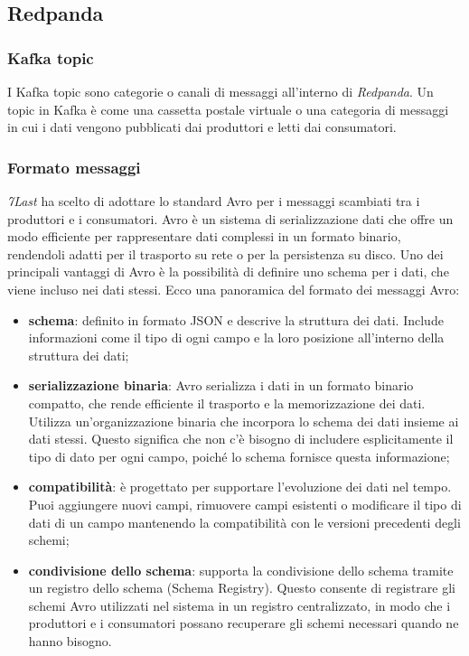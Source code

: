 \subsection{Redpanda}
\subsubsection{Kafka topic}
I Kafka topic sono categorie o canali di messaggi all'interno di \textit{Redpanda}. Un topic in Kafka è come una cassetta postale virtuale o una categoria di messaggi in cui i dati vengono pubblicati dai produttori e letti dai consumatori.
\subsubsection{Formato messaggi}
\textit{7Last} ha scelto di adottare lo standard Avro per i messaggi scambiati tra i produttori e i consumatori. Avro è un sistema di serializzazione dati che offre un modo efficiente per rappresentare dati complessi in un formato binario, rendendoli adatti per il trasporto su rete o per la persistenza su disco. Uno dei principali vantaggi di Avro è la possibilità di definire uno schema per i dati, che viene incluso nei dati stessi. Ecco una panoramica del formato dei messaggi Avro:
\begin{itemize}
    \item \textbf{schema}: definito in formato JSON e descrive la struttura dei dati. Include informazioni come il tipo di ogni campo e la loro posizione all'interno della struttura dei dati;
    \item \textbf{serializzazione binaria}: Avro serializza i dati in un formato binario compatto, che rende efficiente il trasporto e la memorizzazione dei dati. Utilizza un'organizzazione binaria che incorpora lo schema dei dati insieme ai dati stessi. Questo significa che non c'è bisogno di includere esplicitamente il tipo di dato per ogni campo, poiché lo schema fornisce questa informazione;
    \item \textbf{compatibilità}: è progettato per supportare l'evoluzione dei dati nel tempo. Puoi aggiungere nuovi campi, rimuovere campi esistenti o modificare il tipo di dati di un campo mantenendo la compatibilità con le versioni precedenti degli schemi;
    \item \textbf{condivisione dello schema}: supporta la condivisione dello schema tramite un registro dello schema (Schema Registry). Questo consente di registrare gli schemi Avro utilizzati nel sistema in un registro centralizzato, in modo che i produttori e i consumatori possano recuperare gli schemi necessari quando ne hanno bisogno.
\end{itemize}

